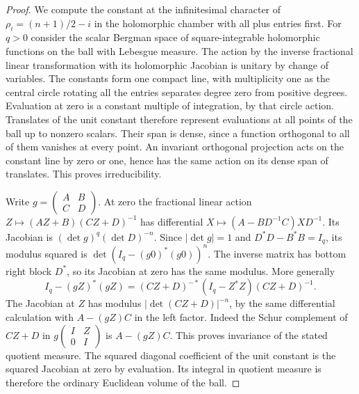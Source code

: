 \documentclass[a4paper,11pt]{article}
\theoremstyle{definition}
\theoremstyle{remark}
\numberwithin{equation}{section}
\begin{document}
\begin{proof}
We compute the constant at the infinitesimal character
of \(\rho_i=(n+1)/2-i\) in the holomorphic chamber with
all plus entries first. For \(q>0\) consider the scalar
Bergman space of square-integrable holomorphic functions
on the ball with Lebesgue measure. The action by the inverse
fractional linear transformation with its holomorphic
Jacobian is unitary by change of variables. The constants
form one compact line, with multiplicity one as the central
circle rotating all the entries separates degree zero from
positive degrees. Evaluation at zero is a constant multiple
of integration, by that circle action. Translates of the unit
constant therefore represent evaluations at all points of
the ball up to nonzero scalars. Their span is dense, since
a function orthogonal to all of them vanishes at every point.
An invariant orthogonal projection acts on the constant line
by zero or one, hence has the same action on its dense span
of translates. This proves irreducibility.

Write \(g=\left(\begin{smallmatrix}A&B\\C&D\end{smallmatrix}\right)\).
At zero the fractional linear action
\(Z\mapsto(AZ+B)(CZ+D)^{-1}\) has differential
\(X\mapsto(A-BD^{-1}C)XD^{-1}\).
Its Jacobian is \((\det g)^q(\det D)^{-n}\).
Since \(|\det g|=1\) and \(D^*D-B^*B=I_q\), its modulus
squared is \(\det(I_q-(g0)^*(g0))^n\). The inverse matrix
has bottom right block \(D^*\), so its Jacobian at zero
has the same modulus. More generally
\[
 I_q-(gZ)^*(gZ)=(CZ+D)^{-*}(I_q-Z^*Z)(CZ+D)^{-1}.
\]
The Jacobian at \(Z\) has modulus \(|\det(CZ+D)|^{-n}\),
by the same differential calculation with
\(A-(gZ)C\) in the left factor. Indeed the Schur complement
of \(CZ+D\) in
\(g\left(\begin{smallmatrix}I&Z\\0&I\end{smallmatrix}\right)\)
is \(A-(gZ)C\). This proves invariance of the stated
quotient measure. The squared diagonal coefficient of
the unit constant is the squared Jacobian at zero by
evaluation. Its integral in quotient measure is therefore
the ordinary Euclidean volume of the ball.


\end{proof}
\end{document}
